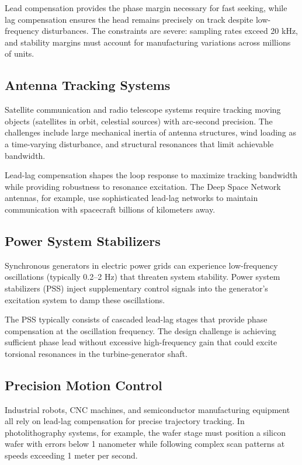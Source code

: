 Lead compensation provides the phase margin necessary for fast seeking, while lag compensation ensures the head remains precisely on track despite low-frequency disturbances. The constraints are severe: sampling rates exceed 20 kHz, and stability margins must account for manufacturing variations across millions of units.

\subsection{Antenna Tracking Systems}

Satellite communication and radio telescope systems require tracking moving objects (satellites in orbit, celestial sources) with arc-second precision. The challenges include large mechanical inertia of antenna structures, wind loading as a time-varying disturbance, and structural resonances that limit achievable bandwidth.

Lead-lag compensation shapes the loop response to maximize tracking bandwidth while providing robustness to resonance excitation. The Deep Space Network antennas, for example, use sophisticated lead-lag networks to maintain communication with spacecraft billions of kilometers away.

\subsection{Power System Stabilizers}

Synchronous generators in electric power grids can experience low-frequency oscillations (typically 0.2--2 Hz) that threaten system stability. Power system stabilizers (PSS) inject supplementary control signals into the generator's excitation system to damp these oscillations.

The PSS typically consists of cascaded lead-lag stages that provide phase compensation at the oscillation frequency. The design challenge is achieving sufficient phase lead without excessive high-frequency gain that could excite torsional resonances in the turbine-generator shaft.

\subsection{Precision Motion Control}

Industrial robots, CNC machines, and semiconductor manufacturing equipment all rely on lead-lag compensation for precise trajectory tracking. In photolithography systems, for example, the wafer stage must position a silicon wafer with errors below 1 nanometer while following complex scan patterns at speeds exceeding 1 meter per second.

